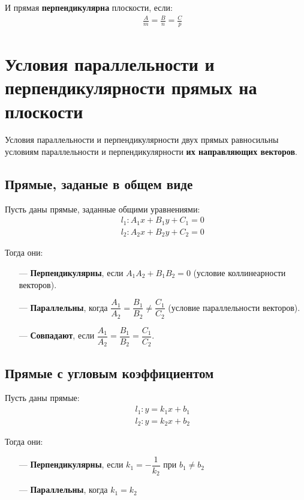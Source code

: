 \documentclass[12pt, fleqn]{extarticle}
\begin{document}
И прямая \textbf{перпендикулярна} плоскости, если:
\begin{align*}
     &  &
    \frac{A}{m} = \frac{B}{n} = \frac{C}{p}
\end{align*}

\newpage

\section{Условия параллельности и перпендикулярности прямых на плоскости}
\label{sec:parallel_perpendicular_lines}

Условия параллельности и перпендикулярности двух прямых равносильны условиям параллельности и перпендикулярности \textbf{их направляющих векторов}.

\subsection*{Прямые, заданые в общем виде}
Пусть даны прямые, заданные общими уравнениями:
\begin{align*}
     &  &
    l_1: A_1x + B_1y + C_1 = 0 \\
     &  &
    l_2: A_2x + B_2y + C_2 = 0
\end{align*}

Тогда они:
\begin{itemize}
    \item[—]{\textbf{Перпендикулярны}, если \(A_1A_2 + B_1B_2 = 0\) (условие коллинеарности векторов).}
    \item[—]{\textbf{Параллельны}, когда \(\dfrac{A_1}{A_2} = \dfrac{B_1}{B_2} \neq \dfrac{C_1}{C_2}\) (условие параллельности векторов).}
    \item[—]{\textbf{Совпадают}, если \(\dfrac{A_1}{A_2} = \dfrac{B_1}{B_2} = \dfrac{C_1}{C_2}\).}
\end{itemize}

\subsection*{Прямые с угловым коэффициентом}
Пусть даны прямые:
\begin{align*}
     &  &
    l_1: y = k_1x + b_1 \\
     &  &
    l_2: y = k_2x + b_2
\end{align*}

Тогда они:
\begin{itemize}
    \item[—]{\textbf{Перпендикулярны}, если \(k_1 = -\dfrac{1}{k_2}\) при \(b_1 \neq b_2\)}
    \item[—]{\textbf{Параллельны}, когда \(k_1 = k_2\)}
\end{itemize}
\end{document}
